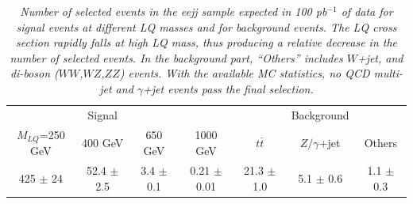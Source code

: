 \documentclass{cmspaper}
\begin{document}
\begin{linenumbers}
%  
%
%

\begin{table}[htbp]
\begin{center}
\begin{tabular}{|cccc||ccc|}
\hline
                 &   Signal&         &          & & Background & \\
$M_{LQ}$=250 GeV & 400 GeV & 650 GeV & 1000 GeV & $t\bar{t}$  & $Z/\gamma$+jet & Others \\
\hline
425 $\pm$ 24 & 52.4 $\pm$ 2.5 & 3.4 $\pm$ 0.1 & 0.21 $\pm$ 0.01 & 21.3 $\pm$ 1.0 & 5.1 $\pm$ 0.6 & 1.1 $\pm$ 0.3 \\
\hline
\end{tabular}
\end{center}
\caption{\small \sl Number of selected events in the eejj sample expected in 100 pb$^{-1}$ of data for signal events at different LQ masses 
and for background events. 
The LQ cross section rapidly falls at high LQ mass, thus 
producing a relative decrease in the number of selected events. 
In the background part, ``Others'' includes $W$+jet, and 
di-boson ($WW$,$WZ$,$ZZ$) events. 
With the available MC statistics, no QCD multi-jet and $\gamma$+jet events pass the final selection.}
\label{tab:EventSelSummary}
\end{table}



\end{linenumbers}
\end{document}
